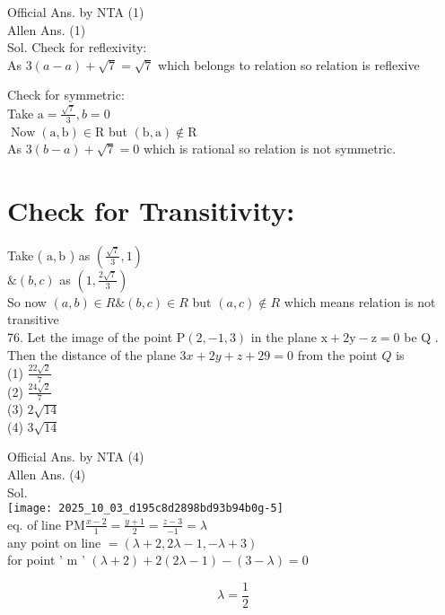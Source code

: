 \documentclass[10pt]{article}
\begin{document}
Official Ans. by NTA (1)\\
Allen Ans. (1)\\
Sol. Check for reflexivity:\\
As \(3(a-a)+\sqrt{7}=\sqrt{7}\) which belongs to relation so relation is reflexive

Check for symmetric:\\
Take \(\mathrm{a}=\frac{\sqrt{7}}{3}, b=0\)\\
\(\operatorname{Now}(\mathrm{a}, \mathrm{b}) \in \mathrm{R}\) but \((\mathrm{b}, \mathrm{a}) \notin \mathrm{R}\)\\
As \(3(b-a)+\sqrt{7}=0\) which is rational so relation is not symmetric.

\section*{Check for Transitivity:}
Take ( \(\mathrm{a}, \mathrm{b}\) ) as \(\left(\frac{\sqrt{7}}{3}, 1\right)\)\\
\(\&(b, c)\) as \(\left(1, \frac{2 \sqrt{7}}{3}\right)\)\\
So now \((a, b) \in R \&(b, c) \in R\) but \((a, c) \notin R\) which means relation is not transitive\\
76. Let the image of the point \(\mathrm{P}(2,-1,3)\) in the plane \(\mathrm{x}+2 \mathrm{y}-\mathrm{z}=0\) be Q . Then the distance of the plane \(3 x+2 y+z+29=0\) from the point \(Q\) is\\
(1) \(\frac{22 \sqrt{2}}{7}\)\\
(2) \(\frac{24 \sqrt{2}}{7}\)\\
(3) \(2 \sqrt{14}\)\\
(4) \(3 \sqrt{14}\)

Official Ans. by NTA (4)\\
Allen Ans. (4)\\
Sol.\\
\texttt{[image: 2025\_10\_03\_d195c8d2898bd93b94b0g-5]}\\
eq. of line \(\mathrm{PM} \frac{x-2}{1}=\frac{y+1}{2}=\frac{z-3}{-1}=\lambda\)\\
any point on line \(=(\lambda+2,2 \lambda-1,-\lambda+3)\)\\
for point ' m ' \((\lambda+2)+2(2 \lambda-1)-(3-\lambda)=0\)

\[
\lambda=\frac{1}{2}
\]
\end{document}
